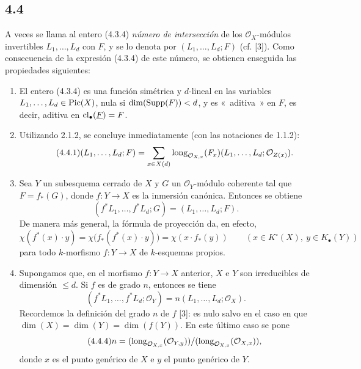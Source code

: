 \subsection*{4.4}
A veces se llama al entero (4.3.4) \emph{número de intersección} de los
\(\mathcal O_X\)-módulos invertibles \(L_1,\ldots,L_d\) con \(F\), y se lo
denota por \((L_1,\ldots,L_d;F)\) (cf. [3]). Como consecuencia de la
expresión (4.3.4) de este número, se obtienen enseguida las propiedades
siguientes:

\begin{enumerate}[label=\arabic*)]
\item El entero (4.3.4) es una función simétrica y \(d\)-lineal en las
variables \(L_1,\ldots,L_d\in\operatorname{Pic}(X)\), nula si
\(\dim(\operatorname{Supp}(F))<d\), y es «~aditiva~» en \(F\), es decir, aditiva en
\(\operatorname{cl}_\bullet(\underline F)=F\).

\item Utilizando 2.1.2, se concluye inmediatamente (con las notaciones de
1.1.2):
\begin{equation}\tag{4.4.1}
 (L_1,\ldots,L_d;F)
 =
 \sum_{x\in X(d)}
 \operatorname{long}_{\mathcal O_{\sisi{}{X},x}}(F_x) %
 (L_1,\ldots,L_d;\mathcal O_{Z(x)}).
\end{equation}

\item Sea \(Y\) un subesquema cerrado de \(X\) y \(G\) un
\(\mathcal O_Y\)-módulo coherente tal que \(F=f_*(G)\), donde
\(f:Y\to X\) es la inmersión canónica. Entonces se obtiene
\[
 (f^*L_1,\ldots,f^*L_d;G)=(L_1,\ldots,L_d;F).
\]
De manera más general, la fórmula de proyección da, en efecto,
\begin{equation}\tag{4.4.2}
 \chi(f^*(x)\cdot y)=\chi\bigl(f_*(f^*(x)\cdot y)\bigr)=\chi(x\cdot f_*(y))
 \qquad (x\in K^\circ(X),\ y\in K_\bullet(Y))
\end{equation}
para todo \(k\)-morfismo \(f:Y\to X\) de \(k\)-esquemas propios.

\item Supongamos que, en el morfismo \(f:Y\to X\) anterior, \(X\) e
\(Y\) son irreducibles de dimensión \(\leq d\). Si \(f\) es de grado
\(n\), entonces se tiene
\begin{equation}\tag{4.4.3}
 (f^*L_1,\ldots,f^*L_d;\mathcal O_Y)
 =
 n(L_1,\ldots,L_d;\mathcal O_X).
\end{equation}
Recordemos la definición del grado \(n\) de \(f\) [3]: es nulo salvo en el
caso en que \(\dim(X)=\dim(Y)=\dim(f(Y))\). En este último caso se pone
\begin{equation}\tag{4.4.4}
 n=(\operatorname{long}_{\mathcal O_{X,x}}(\mathcal O_{Y,y}))/(\operatorname{long}_{\mathcal O_{X,x}}(\mathcal O_{X,x})),
\end{equation}
donde \(x\) es el punto genérico de \(X\) e \(y\) el punto genérico de
\(Y\).
\end{enumerate}

